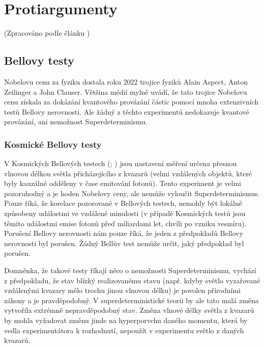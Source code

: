 \section{Protiargumenty}
(Zpracováno podle článku \cite{supdet:rethink})
\subsection{Bellovy testy}


Nobelovu cenu za fyziku dostala roku 2022 trojice fyziků Alain Aspect, Anton Zeilinger a John Clauser. Většina médií mylně uvádí, že tato trojice Nobelovu cenu získala za dokázání kvantového provázání částic pomocí mnoha extenzivních testů Bellovy nerovnosti. Ale žádný z těchto experimentů nedokazuje kvantové provázání, ani nemožnost Superdeterminismu.

\subsubsection{Kosmické Bellovy testy}
V Kosmických Bellových testech (\cite{CosBTest:1}; \cite{CosBTest:2}) jsou nastavení měření určena přesnou vlnovou délkou světla přicházejícího z kvazarů (velmi vzdálených objektů, které byly kauzálně odděleny v čase emitování fotonů). Tento experiment je velmi pozoruhodný a je hoden Nobelovy ceny, ale nemůže vyloučit Superdeterminismus. Pouze říká, že korelace pozorované v Bellových testech, nemohly být lokálně způsobeny událostmi ve vzdálené minulosti (v případě Kosmických testů jsou těmito událostmi emise fotonů před miliardami let, chvíli po vzniku vesmíru). Porušení Bellovy nerovnosti nám pouze říká, že jeden z předpokladů Bellovy nerovnosti byl porušen. Žádný Bellův test nemůže určit, jaký předpoklad byl porušen.

Domněnka, že takové testy říkají něco o nemožnosti Superdeterminismu, vychází z předpokladu, že stav blízký realizovanému stavu (např. kdyby světlo vyzařované vzdálenými kvazary mělo trochu jinou vlnovou délku) je povolen přírodními zákony a je pravděpodobný. V superdeterministické teorii by ale tato malá změna vytvořila extrémně nepravděpodobný stav. Změna vlnové délky světla z kvazarů by mohla vyžadovat změnu jinde na hyperporvchu daného momentu, která by vedla experimentátora k rozhodnutí, nepoužít v experimentu světlo z daných kvazarů.
\clearpage

